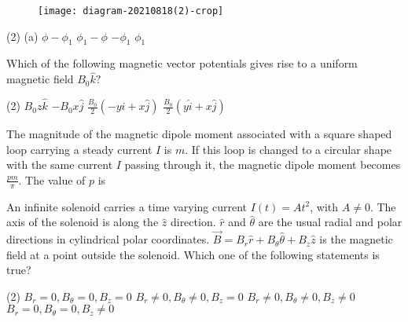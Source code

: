 \begin{enumerate}
\begin{minipage}{\textwidth}
	\begin{figure}[H]
		\centering
		\texttt{[image: diagram-20210818(2)-crop]}
	\end{figure}
\end{minipage}
\begin{tasks}(2)
	\task[\textbf{A.}](a) $\phi-\phi_{1}$
	\task[\textbf{B.}] $\phi_{1}-\phi$
	\task[\textbf{C.}]$-\phi_{1}$
	\task[\textbf{D.}] $\phi_{1}$
\end{tasks}
\begin{minipage}{\textwidth}
	\item Which of the following magnetic vector potentials gives rise to a uniform magnetic field $B_{0} \hat{k} ?$
\end{minipage}
\begin{tasks}(2)
	\task[\textbf{A.}] $B_{0} z \hat{k}$
	\task[\textbf{B.}]$-B_{0} x \hat{j}$
	\task[\textbf{C.}]$\frac{B_{0}}{2}(-y \hat{i}+x \hat{j})$
	\task[\textbf{D.}]$\frac{B_{0}}{2}(y \hat{i}+x \hat{j})$
\end{tasks}
\begin{minipage}{\textwidth}
	\item The magnitude of the magnetic dipole moment associated with a square shaped loop carrying a steady current $I$ is $m$. If this loop is changed to a circular shape with the same current $I$ passing through it, the magnetic dipole moment becomes $\frac{p m}{\pi} .$ The value of $p$ is
\end{minipage}
\begin{minipage}{\textwidth}
	\item An infinite solenoid carries a time varying current $I(t)=A t^{2}$, with $A \neq 0 .$ The axis of the solenoid is along the $\hat{z}$ direction. $\hat{r}$ and $\hat{\theta}$ are the usual radial and polar directions in cylindrical polar coordinates. $\vec{B}=B_{r} \hat{r}+B_{\theta} \hat{\theta}+B_{z} \hat{z}$ is the magnetic field at a point outside the solenoid. Which one of the following statements is true?
\end{minipage}
\begin{tasks}(2)
	\task[\textbf{A.}] $B_{r}=0, B_{\theta}=0, B_{z}=0$
	\task[\textbf{B.}]$B_{r} \neq 0, B_{\theta} \neq 0, B_{z}=0$
	\task[\textbf{C.}] $B_{r} \neq 0, B_{\theta} \neq 0, B_{z} \neq 0$
	\task[\textbf{D.}] $B_{r}=0, B_{\theta}=0, B_{z} \neq 0$
\end{tasks}
\begin{minipage}{\textwidth}

\end{minipage}
\end{enumerate}
